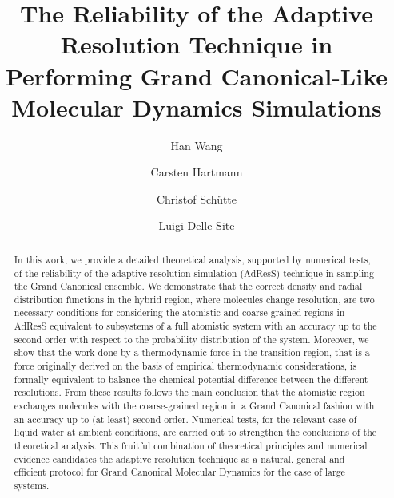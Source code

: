 \documentclass[aps,a4paper,reprint,onecolumn]{revtex4}
\begin{document}
\title{The Reliability of the Adaptive Resolution Technique in Performing  Grand Canonical-Like Molecular Dynamics Simulations}
\author{Han Wang}
\author{Carsten Hartmann}
\author{Christof Sch\"utte}
\author{Luigi Delle Site}

\begin{abstract}
  In this work, we provide a detailed theoretical analysis, supported by numerical tests, of the
  reliability of the adaptive resolution simulation (AdResS) technique in sampling the Grand Canonical
  ensemble. We demonstrate that the correct density and radial distribution
  functions in the hybrid region, where molecules change resolution, are two necessary conditions for
  considering the atomistic and coarse-grained regions in AdResS equivalent to subsystems
  of a full atomistic system with an accuracy up to the second order with respect to the probability distribution of the system. Moreover, we show that the
  work done by a thermodynamic force in the transition region, that is a force originally derived on the basis of empirical thermodynamic considerations, is formally equivalent to balance the chemical
  potential difference between the different resolutions. From these results follows the main conclusion that the atomistic region exchanges
  molecules with the coarse-grained region in a Grand Canonical
  fashion with an accuracy up to (at least) second order. Numerical tests, for the relevant case of liquid water at ambient conditions, are carried out to strengthen the conclusions of the theoretical analysis.
  This fruitful combination of theoretical principles and numerical evidence candidates the adaptive resolution technique as a natural, general and efficient protocol for Grand Canonical Molecular Dynamics for the case of large systems.
\end{abstract}

\maketitle
\end{document}
